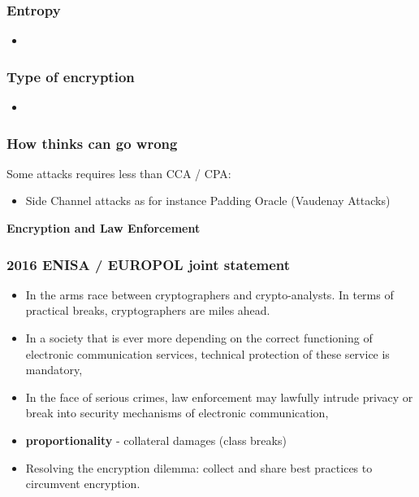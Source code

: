 \documentclass{beamer}
\begin{document}
\begin{frame}
        \frametitle{Entropy}

        \begin{itemize}
          \item
        \end{itemize}

\end{frame}

\begin{frame}
        \frametitle{Type of encryption}

        \begin{itemize}
          \item
        \end{itemize}

\end{frame}


\begin{frame}
        \frametitle{How thinks can go wrong}
        Some attacks requires less than CCA / CPA:
        \begin{itemize}
          \item Side Channel attacks as for instance Padding Oracle (Vaudenay Attacks)
        \end{itemize}

\end{frame}

\begin{frame}
  \begin{center}
    {\bf Encryption and Law Enforcement}
  \end{center}
\end{frame}

\begin{frame}
        \frametitle{2016 ENISA / EUROPOL joint statement}
        \begin{itemize}
          \item In the arms race between cryptographers and crypto-analysts. In
            terms of practical breaks, cryptographers are miles ahead.
          \item In a society that is ever more depending on the correct
            functioning of electronic communication services, technical
            protection of these service is mandatory,
          \item In the face of serious crimes, law enforcement may lawfully
            intrude privacy or break into security mechanisms of electronic communication,
          \item {\bf proportionality} - collateral damages (class breaks)
          \item Resolving the encryption dilemma: collect and share best
            practices to circumvent encryption.
        \end{itemize}
\end{frame}
\end{document}
